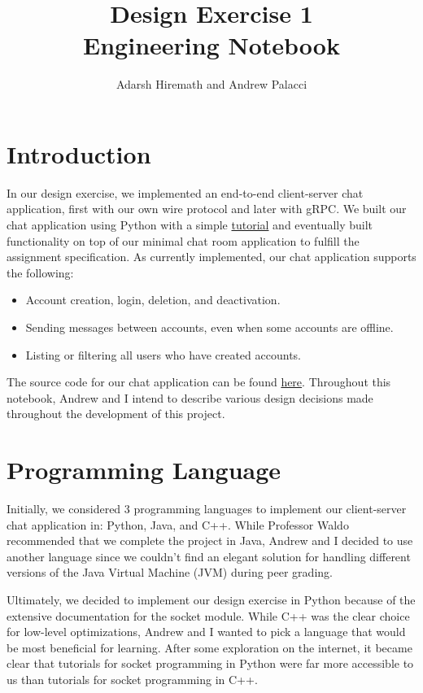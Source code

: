\documentclass[
	a4paper, %
	10pt, %
	unnumberedsections, %
	twoside, %
]{LTJournalArticle}
\title{Design Exercise 1\\ Engineering Notebook} %
\author{%
	Adarsh Hiremath and Andrew Palacci
}
\begin{document}
\maketitle %


\section{Introduction}
In our design exercise, we implemented an end-to-end client-server chat application, first with our own wire protocol and later with gRPC. We built our chat application using Python with a simple \href{https://www.geeksforgeeks.org/simple-chat-room-using-python/}{tutorial} and eventually built functionality on top of our minimal chat room application to fulfill the assignment specification. As currently implemented, our chat application supports the following: 
\begin{itemize}
    \item Account creation, login, deletion, and deactivation. 
    \item Sending messages between accounts, even when some accounts are offline. 
    \item Listing or filtering all users who have created accounts. 
\end{itemize}

The source code for our chat application can be found \href{https://github.com/ahiremathh/chat_protocol}{here}. Throughout this notebook, Andrew and I intend to describe various design decisions made throughout the development of this project. 

\section{Programming Language}
Initially, we considered 3 programming languages to implement our client-server chat application in: Python, Java, and C++. While Professor Waldo recommended that we complete the project in Java, Andrew and I decided to use another language since we couldn't find an elegant solution for handling different versions of the Java Virtual Machine (JVM) during peer grading. 

Ultimately, we decided to implement our design exercise in Python because of the extensive documentation for the socket module. While C++ was the clear choice for low-level optimizations, Andrew and I wanted to pick a language that would be most beneficial for learning. After some exploration on the internet, it became clear that tutorials for socket programming in Python were far more accessible to us than tutorials for socket programming in C++. 
\end{document}
